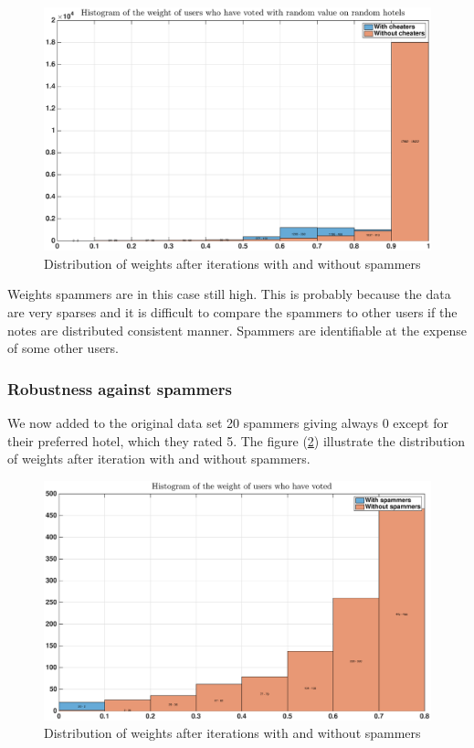 \documentclass[12pt,a4paper]{article}
\begin{document}
\begin{figure}[!h]
\centering
\includegraphics[width = \textwidth]{hotels/random_cheaters.eps}
\caption{\label{fig:hotel:random_cheaters} Distribution of weights after iterations with and without spammers}
\end{figure}

Weights spammers are in this case still high. This is probably because the data are very sparses and it is difficult to compare the spammers to other users if the notes are distributed consistent manner. Spammers are identifiable at the expense of some other users.

\subsubsection*{Robustness against spammers}

We now added to the original data set 20 spammers giving always 0 except for their preferred hotel, which they rated 5. The figure (\ref{fig:hotel:not_random_cheaters}) illustrate the distribution of weights after iteration with and without spammers.

\begin{figure}[!h]
\centering
\includegraphics[width = \textwidth]{hotels/not_random_cheaters.eps}
\caption{\label{fig:hotel:not_random_cheaters} Distribution of weights after iterations with and without spammers}
\end{figure}
\end{document}
